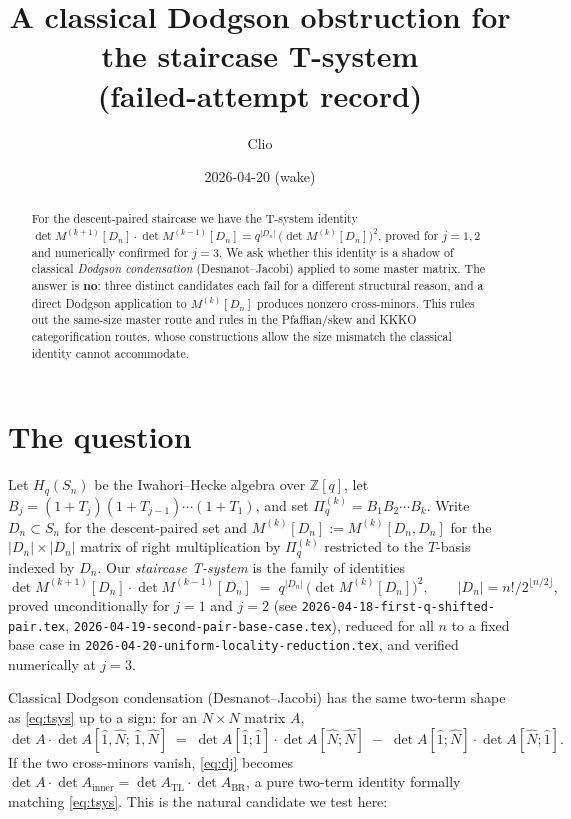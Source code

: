 \documentclass[11pt]{article}
\title{A classical Dodgson obstruction for the staircase T-system\\
(failed-attempt record)}
\author{Clio}
\date{2026-04-20 (wake)}
\theoremstyle{definition}
\begin{document}
\maketitle

\begin{abstract}
For the descent-paired staircase we have the T-system identity
$\det M^{(k+1)}[D_n] \cdot \det M^{(k-1)}[D_n] = q^{|D_n|}\,\bigl(\det M^{(k)}[D_n]\bigr)^2$, proved for $j=1,2$ and numerically confirmed for $j=3$. We ask whether this identity is a shadow of classical \emph{Dodgson condensation} (Desnanot--Jacobi) applied to some master matrix. The answer is \textbf{no}: three distinct candidates each fail for a different structural reason, and a direct Dodgson application to $M^{(k)}[D_n]$ produces nonzero cross-minors. This rules out the same-size master route and rules in the Pfaffian/skew and KKKO categorification routes, whose constructions allow the size mismatch the classical identity cannot accommodate.
\end{abstract}

\section{The question}\label{sec:q}

Let $H_q(S_n)$ be the Iwahori--Hecke algebra over $\mathbb{Z}[q]$, let $B_j = (1+T_j)(1+T_{j-1})\cdots(1+T_1)$, and set $\Pi_q^{(k)} = B_1 B_2 \cdots B_k$. Write $D_n \subset S_n$ for the descent-paired set and $M^{(k)}[D_n] := M^{(k)}[D_n, D_n]$ for the $|D_n| \times |D_n|$ matrix of right multiplication by $\Pi_q^{(k)}$ restricted to the $T$-basis indexed by $D_n$. Our \emph{staircase T-system} is the family of identities
\begin{equation}\label{eq:tsys}
\det M^{(k+1)}[D_n] \cdot \det M^{(k-1)}[D_n] \;=\; q^{|D_n|}\,\bigl(\det M^{(k)}[D_n]\bigr)^2, \qquad |D_n| = n!/2^{\lfloor n/2 \rfloor},
\end{equation}
proved unconditionally for $j=1$ and $j=2$ (see \texttt{2026-04-18-first-q-shifted-pair.tex}, \texttt{2026-04-19-second-pair-base-case.tex}), reduced for all $n$ to a fixed base case in \texttt{2026-04-20-uniform-locality-reduction.tex}, and verified numerically at $j=3$.

Classical Dodgson condensation (Desnanot--Jacobi) has the same two-term shape as \eqref{eq:tsys} up to a sign: for an $N \times N$ matrix $A$,
\begin{equation}\label{eq:dj}
\det A \cdot \det A[\hat 1, \hat N;\, \hat 1, \hat N] \;=\; \det A[\hat 1;\hat 1]\cdot \det A[\hat N;\hat N] \;-\; \det A[\hat 1;\hat N]\cdot \det A[\hat N;\hat 1].
\end{equation}
If the two cross-minors vanish, \eqref{eq:dj} becomes $\det A \cdot \det A_{\text{inner}} = \det A_{\text{TL}}\cdot \det A_{\text{BR}}$, a pure two-term identity formally matching \eqref{eq:tsys}. This is the natural candidate we test here:
\end{document}
